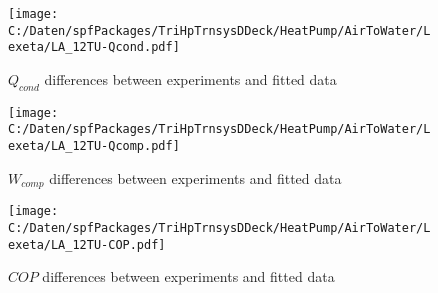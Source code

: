 \documentclass[english]{SPFShortReport}
\begin{document}
\begin{figure}[!ht]
\begin{center}
\texttt{[image: C:/Daten/spfPackages/TriHpTrnsysDDeck/HeatPump/AirToWater/Lexeta/LA\_12TU-Qcond.pdf]}
\caption{$Q_{cond}$ differences between experiments and fitted data}
\label{QcongFig}
\end{center}
\end{figure}
\begin{figure}[!ht]
\begin{center}
\texttt{[image: C:/Daten/spfPackages/TriHpTrnsysDDeck/HeatPump/AirToWater/Lexeta/LA\_12TU-Qcomp.pdf]}
\caption{$W_{comp}$ differences between experiments and fitted data}
\label{QcompFig}
\end{center}
\end{figure}
\begin{figure}[!ht]
\begin{center}
\texttt{[image: C:/Daten/spfPackages/TriHpTrnsysDDeck/HeatPump/AirToWater/Lexeta/LA\_12TU-COP.pdf]}
\caption{$COP$ differences between experiments and fitted data}
\label{COPFig}
\end{center}
\end{figure}
\end{document}

